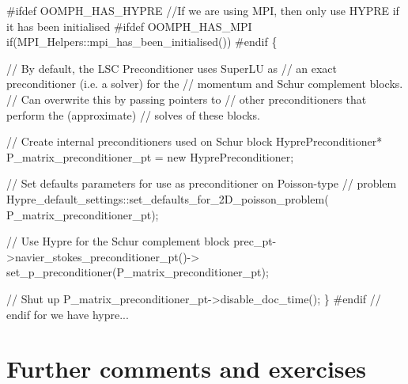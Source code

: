 \begin{DoxyEnumerate}
\begin{DoxyCodeInclude}
\textcolor{preprocessor}{#ifdef OOMPH\_HAS\_HYPRE}
\textcolor{comment}{//If we are using MPI, then only use HYPRE if it has been initialised}
\textcolor{preprocessor}{#ifdef OOMPH\_HAS\_MPI}
      \textcolor{keywordflow}{if}(MPI\_Helpers::mpi\_has\_been\_initialised())
\textcolor{preprocessor}{#endif}
       \{
        
        \textcolor{comment}{// By default, the LSC Preconditioner uses SuperLU as}
        \textcolor{comment}{// an exact preconditioner (i.e. a solver) for the}
        \textcolor{comment}{// momentum and Schur complement blocks. }
        \textcolor{comment}{// Can overwrite this by passing pointers to }
        \textcolor{comment}{// other preconditioners that perform the (approximate)}
        \textcolor{comment}{// solves of these blocks.}
        
        \textcolor{comment}{// Create internal preconditioners used on Schur block}
        HyprePreconditioner* P\_matrix\_preconditioner\_pt = 
         \textcolor{keyword}{new} HyprePreconditioner;
        
        \textcolor{comment}{// Set defaults parameters for use as preconditioner on Poisson-type }
        \textcolor{comment}{// problem}
        Hypre\_default\_settings::set\_defaults\_for\_2D\_poisson\_problem(
         P\_matrix\_preconditioner\_pt);
        
        \textcolor{comment}{// Use Hypre for the Schur complement block}
        prec\_pt->navier\_stokes\_preconditioner\_pt()->
         set\_p\_preconditioner(P\_matrix\_preconditioner\_pt);
        
        \textcolor{comment}{// Shut up}
        P\_matrix\_preconditioner\_pt->disable\_doc\_time();
       \}
\textcolor{preprocessor}{#endif // endif for we have hypre...}

\end{DoxyCodeInclude}

\end{DoxyEnumerate}

 

\hypertarget{index_comm_ex}{}\section{Further comments and exercises}\label{index_comm_ex}

